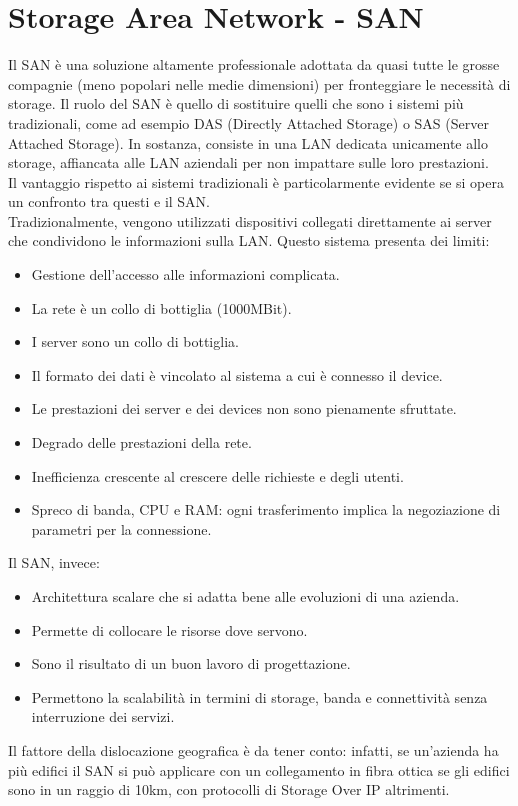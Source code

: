 \documentclass[a4paper]{report}
\begin{document}
\chapter{Storage Area Network - SAN}
Il SAN è una soluzione altamente professionale adottata da quasi tutte le grosse compagnie (meno popolari nelle medie dimensioni) per fronteggiare le necessità di storage. Il ruolo del SAN è quello di sostituire quelli che sono i sistemi più tradizionali, come ad esempio DAS (Directly Attached Storage) o SAS (Server Attached Storage). In sostanza, consiste in una LAN dedicata unicamente allo storage, affiancata alle LAN aziendali per non impattare sulle loro prestazioni. \\
Il vantaggio rispetto ai sistemi tradizionali è particolarmente evidente se si opera un confronto tra questi e il SAN.\\
Tradizionalmente, vengono utilizzati dispositivi collegati direttamente ai server che condividono le informazioni sulla LAN. Questo sistema presenta dei limiti:
\begin{itemize}
\item Gestione dell'accesso alle informazioni complicata.
\item La rete è un collo di bottiglia (1000MBit).
\item I server sono un collo di bottiglia.
\item Il formato dei dati è vincolato al sistema a cui è connesso il device.
\item Le prestazioni dei server e dei devices non sono pienamente
sfruttate.
\item Degrado delle prestazioni della rete.
\item Inefficienza crescente al crescere delle richieste e degli utenti.
\item Spreco di banda, CPU e RAM: ogni trasferimento implica la
negoziazione di parametri per la connessione.
\end{itemize}
Il SAN, invece:
\begin{itemize}
\item Architettura scalare che si adatta bene alle
evoluzioni di una azienda.
\item Permette di collocare le risorse dove servono.
\item Sono il risultato di un buon lavoro di
progettazione.
\item Permettono la scalabilità in termini di storage,
banda e connettività senza interruzione dei
servizi.
\end{itemize}
Il fattore della dislocazione geografica è da tener conto: infatti, se un'azienda ha più edifici il SAN si può applicare con un collegamento in fibra ottica se gli edifici sono in un raggio di 10km, con protocolli di Storage Over IP altrimenti.
\end{document}
